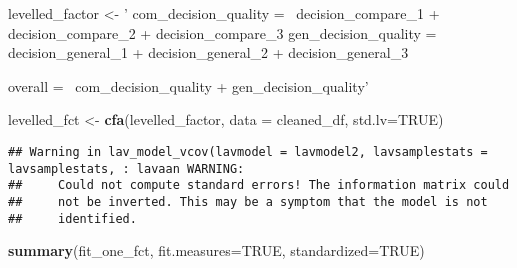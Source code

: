 \documentclass[]{article}
\newenvironment{Shaded}{\begin{snugshade}}{\end{snugshade}}
\newcommand{\DataTypeTok}[1]{\textcolor[rgb]{0.13,0.29,0.53}{#1}}
\newcommand{\KeywordTok}[1]{\textcolor[rgb]{0.13,0.29,0.53}{\textbf{#1}}}
\newcommand{\NormalTok}[1]{#1}
\newcommand{\OtherTok}[1]{\textcolor[rgb]{0.56,0.35,0.01}{#1}}
\newcommand{\StringTok}[1]{\textcolor[rgb]{0.31,0.60,0.02}{#1}}
\begin{document}
\begin{Shaded}
\begin{Highlighting}[]
\NormalTok{levelled_factor <-}\StringTok{ '}
\StringTok{com_decision_quality =~ decision_compare_1 + }
\StringTok{                    decision_compare_2 + }
\StringTok{                    decision_compare_3}
\StringTok{                    }
\StringTok{gen_decision_quality =~ decision_general_1 + }
\StringTok{                    decision_general_2 + }
\StringTok{                    decision_general_3}

\StringTok{overall =~ com_decision_quality + gen_decision_quality'}

\NormalTok{levelled_fct <-}\StringTok{ }\KeywordTok{cfa}\NormalTok{(levelled_factor, }\DataTypeTok{data =}\NormalTok{ cleaned_df, }\DataTypeTok{std.lv=}\OtherTok{TRUE}\NormalTok{)}
\end{Highlighting}
\end{Shaded}

\begin{verbatim}
## Warning in lav_model_vcov(lavmodel = lavmodel2, lavsamplestats = lavsamplestats, : lavaan WARNING:
##     Could not compute standard errors! The information matrix could
##     not be inverted. This may be a symptom that the model is not
##     identified.
\end{verbatim}

\begin{Shaded}
\begin{Highlighting}[]
\KeywordTok{summary}\NormalTok{(fit_one_fct, }\DataTypeTok{fit.measures=}\OtherTok{TRUE}\NormalTok{, }\DataTypeTok{standardized=}\OtherTok{TRUE}\NormalTok{)}
\end{Highlighting}
\end{Shaded}
\end{document}
